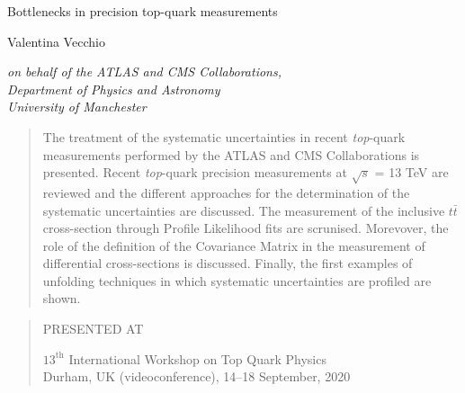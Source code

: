 \documentclass[12pt]{article}
\newcommand\pubnumber{SNSN-323-63}
\newcommand\pubdate{\today}
\def\institute{on behalf of the ATLAS and CMS Collaborations,\\Department of Physics and Astronomy\\ University of Manchester}
\def\Title#1{\begin{center} {\Large #1 } \end{center}}
\def\Author#1{\begin{center}{ \sc #1} \end{center}}
\def\Address#1{\begin{center}{ \it #1} \end{center}}
\newcommand\pubblock{\rightline{\begin{tabular}{l} \pubnumber\\
         \pubdate  \end{tabular}}}
\newenvironment{Abstract}{\begin{quotation}  }{\end{quotation}}
\newenvironment{Presented}{\begin{quotation} \begin{center} 
             PRESENTED AT\end{center}\bigskip 
      \begin{center}\begin{large}}{\end{large}\end{center} \end{quotation}}
\begin{document}
\begin{titlepage}
\pubblock

\vfill
\Title{Bottlenecks in precision top-quark measurements}
\vfill
\Author{ Valentina Vecchio}
\Address{\institute}
\vfill
\begin{Abstract}


The treatment of the systematic uncertainties in recent \emph{top}-quark measurements performed by the ATLAS and CMS Collaborations is presented. Recent \emph{top}-quark precision measurements at $\sqrt{s}$ = 13 TeV are reviewed and the different approaches for the determination of the systematic uncertainties are discussed. The measurement of the inclusive $t\bar{t}$ cross-section through Profile Likelihood fits are scrunised. Morevover, the role of the definition of the Covariance Matrix in the measurement of differential cross-sections is discussed. Finally, the first examples of unfolding techniques in which systematic uncertainties are profiled are shown.


\end{Abstract}
\vfill
\begin{Presented}
$13^\mathrm{th}$ International Workshop on Top Quark Physics\\
Durham, UK (videoconference), 14--18 September, 2020
\end{Presented}
\vfill
\end{titlepage}
\def\thefootnote{\fnsymbol{footnote}}
\setcounter{footnote}{0}
%
\end{document}
